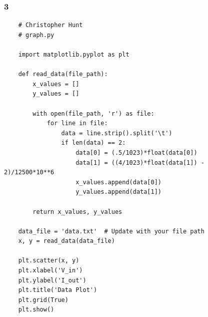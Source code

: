 \documentclass{article}
\begin{document}
\newpage
\subsubsection*{3}
\begin{lstlisting}
    # Christopher Hunt
    # graph.py
    
    import matplotlib.pyplot as plt
    
    def read_data(file_path):
        x_values = []
        y_values = []
    
        with open(file_path, 'r') as file:
            for line in file:
                data = line.strip().split('\t')
                if len(data) == 2:
                    data[0] = (.5/1023)*float(data[0])
                    data[1] = ((4/1023)*float(data[1]) - 2)/12500*10**6
                    x_values.append(data[0])
                    y_values.append(data[1])
    
        return x_values, y_values
    
    data_file = 'data.txt'  # Update with your file path
    x, y = read_data(data_file)
    
    plt.scatter(x, y)
    plt.xlabel('V_in')
    plt.ylabel('I_out')
    plt.title('Data Plot')
    plt.grid(True)
    plt.show()
\end{lstlisting}
\end{document}
